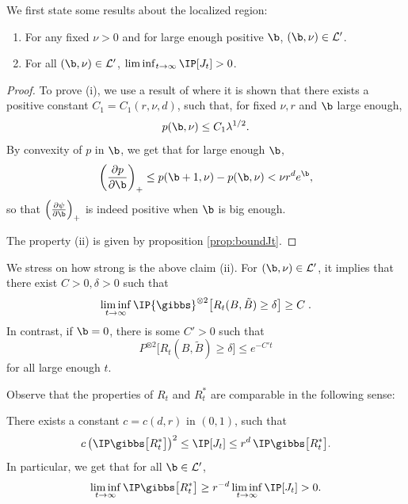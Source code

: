 We first state some results about the localized region:
\begin{proposition}
\begin{enumerate}[label=(\roman*)]
\item For any fixed $\nu>0$ and for large enough positive $\b$, $(\b,\nu) \in \mathcal{L}'$.
\item For all $(\b,\nu) \in \mathcal{L}'$, $\liminf_{t\to\infty} \IP[J_t] > 0$.
\end{enumerate}
\end{proposition}
\begin{proof}
To prove (i), we use a result of \cite[Th. 2.2.2.(b)]{CY05}
where it is shown that there exists a positive constant $C_1=C_1(r,\nu,d)$, such that, for fixed $\nu, r$ and $\b$ large enough,
\[p(\b,\nu) \leq C_1 \lambda^{1/2}.\]
By convexity of $p$ in $\b$, we get that for large enough $\b$,
$$\left(  \frac{\partial p}{\partial \b}\right)_+ \leq p(\b+1,\nu) - p(\b,\nu) 
 < \nu r^d e^\b,
$$
so that
$\left(  \frac{\partial \psi}{\partial \b}\right)_+$ is indeed positive when $\b$ is big enough.

The property (ii) is given by proposition \ref{prop:boundJt}.
\end{proof}
\begin{remark}
We stress on how strong is the above claim (ii). For $(\b,\nu) \in \mathcal{L}'$, it implies that   there exist $C>0, \delta>0$ such that 
$$\liminf_{t\to\infty} \IP  {\gibbs}^{ \otimes 2} \big[ R_t(B, \tilde{B}) \geq \delta \big] \geq C\;.$$
In contrast, if $\b=0$, there is  some $C'>0$ such that
$$
P^{\otimes 2}  \big[ R_t(B, \tilde{B}) \geq \delta \big] \leq e^{-C't}
$$
for all large enough $t$.
\end{remark}
Observe that the properties of $R_t$ and $R_t^*$ are comparable in the following sense:
\begin{theorem} \label{th:localization}
There exists a constant $c=c(d,r)$ in $(0,1)$, such that
\begin{equation} \label{eq:2to1}
c\left(\IP\gibbs \big[R_t^*\big] \right)^2 \leq \IP[J_t] \leq r^d \, \IP \gibbs\big[R_t^*\big].
\end{equation}
In particular, we get that for all $\b\in\mathcal{L}'$,
\begin{equation} \label{eq:localization}
\liminf_{t\to\infty} \IP \gibbs \big[R_t^*\big] \geq r^{-d}\liminf_{t\to\infty} \IP[J_t] >0.
\end{equation}
\end{theorem}
